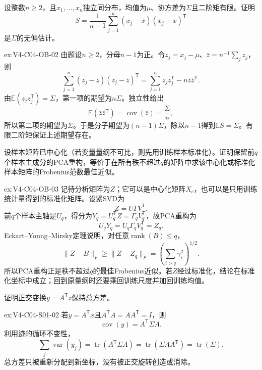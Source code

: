 \begin{SLChapterExercisePairSection}
\begin{exercise}\label{ex:V4-C04-OB-02}
设整数$n\geq2$，且$x_1,\ldots,x_n$独立同分布，均值为$\mu$、协方差为$\Sigma$且二阶矩有限。证明
\[
S=\frac1{n-1}\sum_{j=1}^n(x_j-\bar x)(x_j-\bar x)^{\mathsf T}
\]
是$\Sigma$的无偏估计。
\end{exercise}
\ifSLFullEdition
{}\label{sol:V4-C04-OB-02}
\begin{chapterexercisesolution}{ex:V4-C04-OB-02}
由题设$n\geq2$，分母$n-1$为正。令$z_j=x_j-\mu$、$\bar z=n^{-1}\sum_jz_j$，则
\[
\sum_{j=1}^n(z_j-\bar z)(z_j-\bar z)^{\mathsf T}
=\sum_{j=1}^nz_jz_j^{\mathsf T}-n\bar z\bar z^{\mathsf T}.
\]
由$\mathbb E(z_jz_j^{\mathsf T})=\Sigma$，第一项的期望为$n\Sigma$。独立性给出
\[
\mathbb E(\bar z\bar z^{\mathsf T})
=\operatorname{cov}(\bar z)=\frac{\Sigma}{n},
\]
所以第二项的期望为$\Sigma$。于是分子期望为$(n-1)\Sigma$，除以$n-1$得到$\mathbb E S=\Sigma$。有限二阶矩保证上述期望存在。
\end{chapterexercisesolution}
\fi

\begin{exercise}\label{ex:V4-C04-OB-03}
设样本矩阵已中心化（若变量量纲不可比，则先用训练样本标准化）。证明保留前$q$个样本主成分的PCA重构，等价于在所有秩不超过$q$的矩阵中求该中心化或标准化样本矩阵的Frobenius范数最佳近似。
\end{exercise}
\ifSLFullEdition
{}\label{sol:V4-C04-OB-03}
\begin{chapterexercisesolution}{ex:V4-C04-OB-03}
记待分析矩阵为$Z$；它可以是中心化矩阵$X_c$，也可以是只用训练统计量得到的标准化矩阵。设紧SVD为
\[
Z=U\Gamma V^{\mathsf T}.
\]
前$q$个样本主轴是$U_q$，得分为$Y_q=U_q^{\mathsf T}Z=\Gamma_qV_q^{\mathsf T}$，故PCA重构为
\[
U_qY_q=U_q\Gamma_qV_q^{\mathsf T}=Z_q.
\]
Eckart--Young--Mirsky定理说明，对任意$\operatorname{rank}(B)\le q$，
\[
\|Z-B\|_F\ge
\|Z-Z_q\|_F
=\left(\sum_{i>q}\gamma_i^2\right)^{1/2}.
\]
所以PCA重构正是秩不超过$q$的最佳Frobenius近似。若$Z$经过标准化，结论在标准化坐标中成立；回到原量纲时还要乘回训练尺度并加回训练均值。
\end{chapterexercisesolution}
\fi

\begin{exercise}\label{ex:V4-C04-S01-02}
证明正交变换$y=A^{\mathsf T}z$保持总方差。
\end{exercise}
\ifSLFullEdition
{}\label{sol:V4-C04-S01-02}
\begin{chapterexercisesolution}{ex:V4-C04-S01-02}
若$y=A^{\mathsf T}x$且$A^{\mathsf T}A=AA^{\mathsf T}=I$，则
\[
\operatorname{cov}(y)=A^{\mathsf T}\Sigma A.
\]
利用迹的循环不变性，
\[
\sum_j\operatorname{var}(y_j)
=\operatorname{tr}(A^{\mathsf T}\Sigma A)
=\operatorname{tr}(\Sigma AA^{\mathsf T})
=\operatorname{tr}(\Sigma).
\]
总方差只被重新分配到新坐标，没有被正交旋转创造或消除。
\end{chapterexercisesolution}
\fi


\end{SLChapterExercisePairSection}
